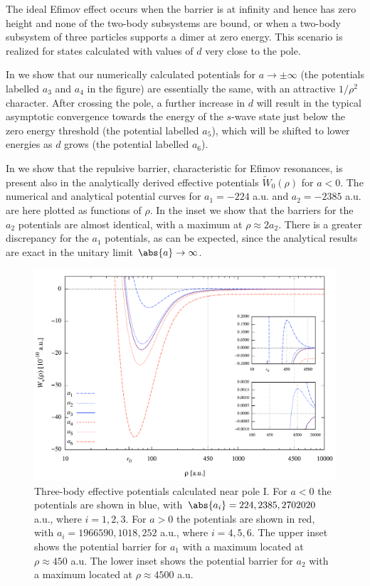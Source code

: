 The ideal Efimov effect occurs when the barrier is at infinity and hence has zero height and none of the two-body subsystems are bound, or when a two-body subsystem of three particles supports a dimer at zero energy. This scenario is realized for states calculated with values of $d$ very close to the pole. 

In  we show that our numerically calculated potentials for $a \rightarrow \pm \infty$ (the potentials labelled $a_3$ and $a_4$ in the figure) are essentially the same, with an attractive $1/\rho^2$ character. After crossing the pole, a further increase in $d$ will result in the typical asymptotic convergence towards the energy of the $s$-wave state just below the zero energy threshold (the potential labelled $a_5$), which will be shifted to lower energies as $d$ grows (the potential labelled $a_6$).  

In  we show that the repulsive barrier, characteristic for Efimov resonances, is present also in the analytically derived effective potentials $\widetilde{W}_0(\rho)$ for $a<0$. The numerical and analytical potential curves for $a_1=-224$ a.u. and $a_2=-2385$ a.u. are here plotted as functions of $\rho$. In the inset we show that the barriers for the $a_2$ potentials are almost identical, with a maximum at $\rho \approx 2a_2$. There is a greater discrepancy for the $a_1$ potentials, as can be expected, since the analytical results are exact in the unitary limit $\abs{a} \rightarrow \infty$.

\begin{figure}
	\includegraphics[width=\linewidth]{barrier.pdf}
	\caption{Three-body effective potentials calculated near pole $\mathrm{I}$. For $a<0$ the potentials are shown in blue, with $\abs{a_i}=224,2385,2702020$ a.u., where $i=1,2,3$. For $a>0$ the potentials are shown in red, with $a_i=1966590,1018,252$ a.u., where $i=4,5,6$. The upper inset shows the potential barrier for $a_1$ with a maximum located at $\rho \approx 450$ a.u. The lower inset shows the potential barrier for $a_2$ with a maximum located at $\rho \approx 4500$ a.u.}
	\label{fig:barrier}
\end{figure}

